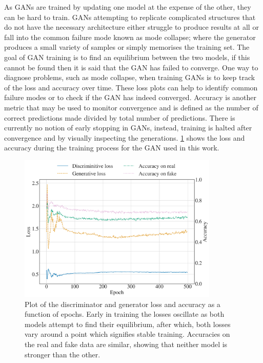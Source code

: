 \documentclass[12pt]{iopart}
\begin{document}
As \acp{GAN} are trained by updating one model at the expense of the other, they can be hard to train. GANs attempting to replicate complicated structures that do not
have the necessary architecture either struggle to produce results at all or
fall into the common failure mode known as mode collapse; where the generator
produces a small variety of samples or simply memorises the training set. The goal of \ac{GAN} training is to find an equilibrium between the two models, if this cannot be found then it is said that the \ac{GAN} has failed to converge. One way to diagnose problems, such as mode collapse, when training \acp{GAN} is to keep track of the loss and accuracy over time. These loss plots can help to identify common failure modes or to check if the \ac{GAN} has indeed converged. Accuracy is another metric that may be used to monitor convergence and is defined as the number of correct predictions made divided by total number of predictions. There is currently no notion of early stopping in \acp{GAN}, instead, training is halted after convergence and by visually inspecting the generations. \cref{fig:lossplot} shows the loss and accuracy during the training process for the GAN used in this work. 
\begin{figure}[h!]
    \centering
    \includegraphics[width=0.85\textwidth]{figures/losses.png}
    \caption{Plot of the discriminator and generator loss and accuracy as a function of epochs. Early in training the losses oscillate as both models attempt to find their equilibrium, after which, both losses vary around a point which signifies stable training. Accuracies on the real and fake data are similar, showing that neither model is stronger than the other.}
    \label{fig:lossplot}
\end{figure}
\end{document}
